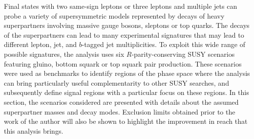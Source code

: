 
Final states with two same-sign leptons or three leptons and multiple jets can probe a variety of supersymmetric models 
represented by decays of heavy superpartners involving massive gauge bosons, sleptons or top quarks. 
The decays of the superpartners can lead to many experimental signatures that may lead to different lepton, jet, and $b$-tagged jet multiplicities.
To exploit this wide range of possible signatures, the analysis uses six $R$-parity-conserving SUSY scenarios 
featuring gluino, bottom squark or top squark pair production. 
These scenarios were used as benchmarks to identify regions of the phase space 
where the analysis can bring particularly useful complementarity to other SUSY 
searches, 
and subsequently define signal regions with a particular focus on these 
regions. 
In this section, the scenarios considered are presented with details about 
the assumed superpartner masses and decay modes.  
Exclusion limits obtained prior to the work of the author will also 
be shown to highlight the improvement in reach that this analysis brings.

